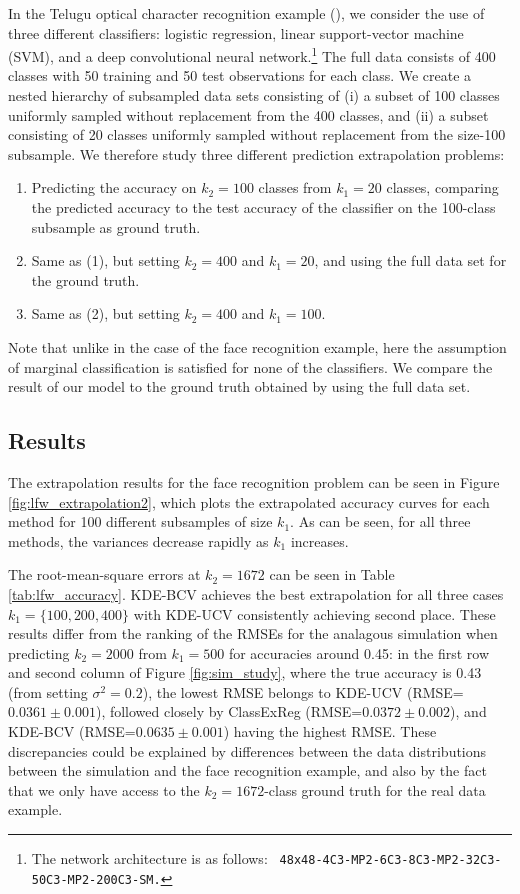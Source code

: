 \documentclass[twoside,11pt]{article}
\begin{document}
In the Telugu optical character recognition example
(\cite{achanta2015telugu}), we consider
the use of three different classifiers: logistic
regression, linear support-vector machine (SVM), and a
deep convolutional neural network.\footnote{The network architecture is
  as follows: {\tt
    48x48-4C3-MP2-6C3-8C3-MP2-32C3-50C3-MP2-200C3-SM.}}
The full data consists of 400 classes with 50 training and 50 test observations for each class. We create a nested hierarchy of subsampled data sets consisting of (i) a subset of 100 classes uniformly sampled without replacement from the 400 classes, and (ii) a subset consisting of 20 classes uniformly sampled without replacement from the size-100 subsample.   We therefore study three different prediction extrapolation problems:
\begin{enumerate}
\item Predicting the accuracy on $k_2 = 100$ classes from $k_1 = 20$ classes, comparing the predicted accuracy to the test accuracy of the classifier on the 100-class subsample as ground truth.
\item Same as (1), but setting $k_2 = 400$ and $k_1 = 20$, and using the full data set for the ground truth.
\item Same as (2), but setting $k_2 = 400$ and $k_1 = 100$.
\end{enumerate}
Note that unlike in the case of the face recognition example,
here the assumption of marginal classification is satisfied for none of
the classifiers.
We compare the result of our model to the ground
truth obtained by using the full data set.

\subsection{Results}

The extrapolation results for the face recognition problem can be seen in Figure
\ref{fig:lfw_extrapolation2}, which plots the extrapolated accuracy
curves for each method for 100 different subsamples of size $k_1$.  As
can be seen, for all three methods, the variances decrease rapidly as
$k_1$ increases.

The root-mean-square errors at $k_2=1672$ can be seen in Table
\ref{tab:lfw_accuracy}.  KDE-BCV achieves the best extrapolation for
all three cases $k_1= \{100,200,400\}$ with KDE-UCV consistently
achieving second place.  These results differ from the ranking of the
RMSEs for the analagous simulation when predicting $k_2 = 2000$ from
$k_1 = 500$ for accuracies around 0.45: in the first row and second
column of Figure \ref{fig:sim_study}, where the true accuracy is 0.43
(from setting $\sigma^2=0.2$), the lowest RMSE belongs to KDE-UCV
(RMSE=$0.0361 \pm 0.001$), followed closely by ClassExReg (RMSE=$0.0372
\pm 0.002$), and KDE-BCV (RMSE=$0.0635\pm0.001$) having the highest
RMSE.  These discrepancies could be explained by differences between
the data distributions between the simulation and the face recognition
example, and also by the fact that we only have access to the $k_2 =
1672$-class ground truth for the real data example.
\end{document}
